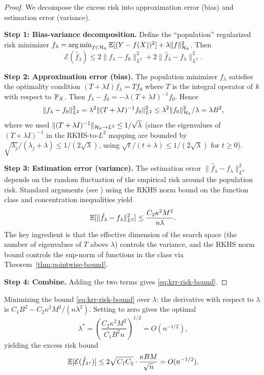 \documentclass[11pt,a4paper]{article}
\begin{document}
\begin{proof}
We decompose the excess risk into approximation error (bias)
and estimation error (variance).

\textbf{Step 1: Bias-variance decomposition.} Define the
``population'' regularized risk minimizer
$f_\lambda = \operatorname{arg\,min}_{f \in \mathcal{H}_k} \mathbb{E}[(Y - f(X))^2] +
\lambda \|f\|_{\mathcal{H}_k}^2$. Then
\[
\mathcal{E}(\hat{f}_\lambda) \le 2 \|f_\lambda - f_0\|_{L^2}^2
+ 2 \|\hat{f}_\lambda - f_\lambda\|_{L^2}^2.
\]

\textbf{Step 2: Approximation error (bias).} The population
minimizer $f_\lambda$ satisfies the optimality condition
$(T + \lambda I) f_\lambda = T f_0$ where $T$ is the integral
operator of $k$ with respect to $\mathbb{P}_X$. Then
$f_\lambda - f_0 = -\lambda (T + \lambda I)^{-1} f_0$. Hence
\[
\|f_\lambda - f_0\|_{L^2}^2 = \lambda^2 \|(T + \lambda I)^{-1}
f_0\|_{L^2}^2 \le \lambda^2 \|f_0\|_{\mathcal{H}_k}^2 / \lambda
= \lambda B^2,
\]
where we used $\|(T + \lambda I)^{-1}\|_{\mathcal{H}_k \to L^2} \le
1/\sqrt{\lambda}$ (since the eigenvalues of $(T + \lambda I)^{-1}$
in the RKHS-to-$L^2$ mapping are bounded by $\sqrt{\lambda_j} /
(\lambda_j + \lambda) \le 1/(2\sqrt{\lambda})$, using
$\sqrt{t}/(t + \lambda) \le 1/(2\sqrt{\lambda})$ for $t \ge 0$).

\textbf{Step 3: Estimation error (variance).} The estimation error
$\|\hat{f}_\lambda - f_\lambda\|_{L^2}^2$ depends on the random
fluctuation of the empirical risk around the population risk.
Standard arguments (see \citet[Chapter 5]{bach2024}) using the
RKHS norm bound on the function class and concentration
inequalities yield
\[
\mathbb{E}[\|\hat{f}_\lambda - f_\lambda\|_{L^2}^2] \le
\frac{C_2 \kappa^2 M^2}{n\lambda}.
\]
The key ingredient is that the effective dimension of the
search space (the number of eigenvalues of $T$ above $\lambda$)
controls the variance, and the RKHS norm bound controls the
sup-norm of functions in the class via
Theorem~\ref{thm:pointwise-bound}.

\textbf{Step 4: Combine.} Adding the two terms gives
\eqref{eq:krr-risk-bound}.
\end{proof}

\begin{corollary}
\label{cor:optimal-lambda}
Minimizing the bound \eqref{eq:krr-risk-bound} over $\lambda$:
the derivative with respect to $\lambda$ is
$C_1 B^2 - C_2 \kappa^2 M^2 / (n\lambda^2)$. Setting to zero
gives the optimal
\begin{equation}
\label{eq:optimal-lambda}
\lambda^* = \left(\frac{C_2 \kappa^2 M^2}{C_1 B^2 n}\right)^{1/2}
= O(n^{-1/2}),
\end{equation}
yielding the excess risk bound
\begin{equation}
\label{eq:optimal-risk}
\mathbb{E}[\mathcal{E}(\hat{f}_{\lambda^*})]
\le 2\sqrt{C_1 C_2} \cdot \frac{\kappa B M}{\sqrt{n}}
= O(n^{-1/2}).
\end{equation}
\end{corollary}
\end{document}
